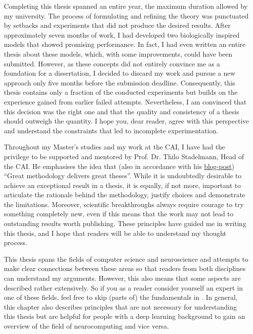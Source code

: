 Completing this thesis spanned an entire year, the maximum duration allowed by my university.
The process of formulating and refining the theory was punctuated by setbacks and experiments that did not produce the desired results.
After approximately seven months of work, I had developed two biologically inspired models that showed promising performance. 
In fact, I had even written an entire thesis about these models, which, with some improvements, could have been submitted.
However, as these concepts did not entirely convince me as a foundation for a dissertation, I decided to discard my work and pursue a new approach only five months before the submission deadline.
Consequently, this thesis contains only a fraction of the conducted experiments but builds on the experience gained from earlier failed attempts.
Nevertheless, I am convinced that this decision was the right one and that the quality and consistency of a thesis should outweigh the quantity.
I hope you, dear reader, agree with this perspective and understand the constraints that led to incomplete experimentation.

Throughout my Master's studies and my work at the CAI, I  have had the privilege to be supported and mentored by Prof. Dr. Thilo Stadelmann, Head of the CAI.
He emphasises the idea that (also in accordance with his \href{https://stdm.github.io/Great-methodology-delivers-great-theses/}{blog-post}) ``Great methodology delivers great theses''.
While it is undoubtedly desirable to achieve an exceptional result in a thesis, it is equally, if not more, important to articulate the rationale behind the methodology, justify choices and demonstrate the limitations. 
Moreover, scientific breakthroughs always require courage to try something completely new, even if this means that the work may not lead to outstanding results worth publishing.
These principles have guided me in writing this thesis, and I hope that readers will be able to understand my thought process.

This thesis spans the fields of computer science and neuroscience and attempts to make clear connections between these areas so that readers from both disciplines can understand my arguments. 
However, this also means that some aspects are described rather extensively.
So if you as a reader consider yourself an expert in one of these fields, feel free to skip (parts of) the fundamentals in .
In general, this chapter also describes principles that are not necessary for understanding this thesis but are helpful for people with a deep learning background to gain an overview of the field of neurocomputing and vice versa.

